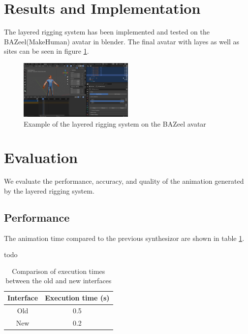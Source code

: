 \documentclass[../../main.tex]{subfiles}
\begin{document}
\section{Results and Implementation}
\label{ch:rigging_layers:results}

The layered rigging system has been implemented and tested on the BAZeel(MakeHuman) avatar in blender. The final avatar with layes as well as sites can be seen in figure \ref{fig:layers_example}.

\begin{figure}
    \centering
    \includegraphics[width=0.5\textwidth]{chapters/rigging_layers/images/layers_example.png}
    \caption{Example of the layered rigging system on the BAZeel avatar}
    \label{fig:layers_example}
\end{figure}

\section{Evaluation}
\label{ch:rigging_layers:evaluation}

We evaluate the performance, accuracy, and quality of the animation generated by the layered rigging system.

\subsection{Performance}
\label{ch:rigging_layers:evaluation:performance}

The animation time compared to the previous synthesizor are shown in table \ref{tab:faster_executions}.

todo
\begin{table}
    \centering
    \begin{tabular}{|c|c|}
        \hline
        \textbf{Interface} & \textbf{Execution time (s)} \\
        \hline
        Old & 0.5 \\
        New & 0.2 \\
        \hline
    \end{tabular}
    \caption{Comparison of execution times between the old and new interfaces}
    \label{tab:faster_executions}
\end{table}
\end{document}

